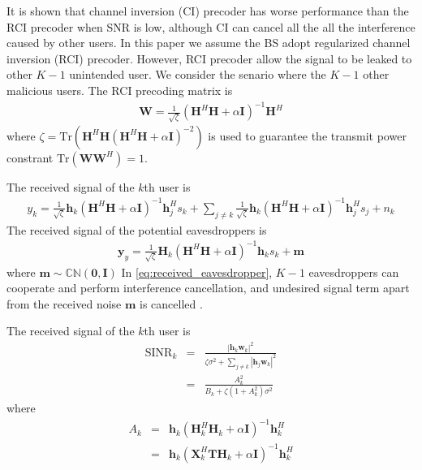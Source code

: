 \documentclass[12pt,journal,draftclsnofoot,onecolumn]{IEEEtran}
\begin{document}
It is shown that channel inversion (CI) precoder has worse performance than the RCI precoder when SNR is low, although CI can cancel all the all the interference caused by other users. In this paper we assume the BS adopt regularized channel inversion (RCI) precoder.  However, RCI precoder allow the signal to be leaked to other $K-1$ unintended user. We consider the senario where the $K-1$ other malicious users. The RCI precoding matrix is 
\begin{eqnarray}
\mathbf{W} = \frac{1}{\sqrt{\zeta}}\left(\mathbf{H}^H\mathbf{H} + \alpha\mathbf{I}\right)^{-1}\mathbf{H}^H
\end{eqnarray}
where $\zeta = \mathrm{Tr}\left(\mathbf{H}^H\mathbf{H}\left(\mathbf{H}^H\mathbf{H} + \alpha\mathbf{I}\right)^{-2}\right)$ is used to guarantee the transmit power constrant $\mathrm{Tr}\left(\mathbf{W}\mathbf{W}^H\right) = 1$.




 
The received signal of the $k$th user is 
\begin{eqnarray}
y_k = \frac{1}{\sqrt{\zeta}}\mathbf{h}_k\left(\mathbf{H}^H\mathbf{H} + \alpha\mathbf{I}\right)^{-1}\mathbf{h}_j^Hs_k + \sum_{j \neq k}\frac{1}{\sqrt{\zeta}}\mathbf{h}_k\left(\mathbf{H}^H\mathbf{H} + \alpha\mathbf{I}\right)^{-1}\mathbf{h}_j^Hs_j + n_k
\end{eqnarray}
The received signal of the potential eavesdroppers is 
\begin{eqnarray}
\mathbf{y}_y= \frac{1}{\sqrt{\zeta}}\mathbf{H}_k\left(\mathbf{H}^H\mathbf{H} + \alpha\mathbf{I}\right)^{-1}\mathbf{h}_ks_k + \mathbf{m} \label{eq:received_eavesdropper}
\end{eqnarray}
where $\mathbf{m} \sim \mathbb{C}\mathbb{N}(\mathbf{0},\mathbf{I})$
In \eqref{eq:received_eavesdropper}, $K-1$ eavesdroppers can cooperate and perform interference cancellation, and undesired signal term apart from the received noise $\mathbf{m}$ is cancelled \cite{geraci2012secrecy}.

The received signal of the $k$th user is 
\begin{eqnarray}
\mathrm{SINR}_{k} &=& \frac{|\mathbf{h}_k\mathbf{w}_k|^2}{\zeta\sigma^2 + \sum_{j \neq k} |\mathbf{h}_j\mathbf{w}_k|^2}\\
&=& \frac{A_k^2}{B_k + \zeta(1+A_k^2)\sigma^2}
\end{eqnarray}
where
\begin{eqnarray}
A_k &=& \mathbf{h}_k\left(\mathbf{H}_k^H\mathbf{H}_k + \alpha\mathbf{I}\right)^{-1}\mathbf{h}_k^H\\
&=& \mathbf{h}_k\left(\mathbf{X}_k^H\mathbf{T}\mathbf{H}_k + \alpha\mathbf{I}\right)^{-1}\mathbf{h}_k^H
\end{eqnarray}
\end{document}
